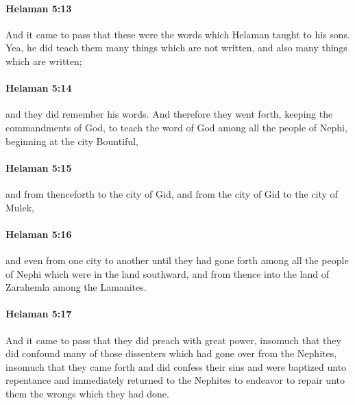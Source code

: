 		\paragraph{Helaman 5:13} %
			\label{HELAMAN-5-13}

			And it came to pass that these were the words which Helaman taught to his sons.
			Yea, he did teach them many things which are not written,
			and also many things which are written;

		\paragraph{Helaman 5:14} %
			\label{HELAMAN-5-14}

			and they did remember his words.
			And therefore they went forth, keeping the commandments of God,
			to teach the word of God among all the people of Nephi,
			beginning at the city Bountiful,

		\paragraph{Helaman 5:15} %
			\label{HELAMAN-5-15}

			and from thenceforth to the city of Gid,
			and from the city of Gid to the city of Mulek,

		\paragraph{Helaman 5:16} %
			\label{HELAMAN-5-16}

			and even from one city to another
			until they had gone forth among all the people of Nephi
			which were in the land southward,
			and from thence into the land of Zarahemla among the Lamanites.

		\paragraph{Helaman 5:17} %
			\label{HELAMAN-5-17}

			And it came to pass that they did preach with great power,
			insomuch that they did confound many of those dissenters
			which had gone over from the Nephites,
			insomuch that they came forth and did confess their sins
			and were baptized unto repentance
			and immediately returned to the Nephites
			to endeavor to repair unto them the wrongs which they had done.

